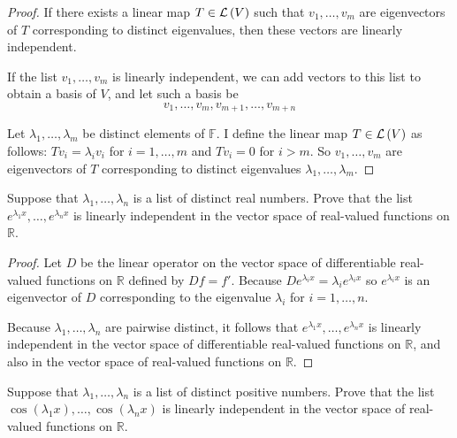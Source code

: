 \begin{proof}
    If there exists a linear map $T\in\mathcal{L}\left({V}\right)$ such that $v_{1} , \ldots, v_{m}$ are eigenvectors of $T$ corresponding to distinct eigenvalues, then these vectors are linearly independent.

    If the list $v_{1} , \ldots, v_{m}$ is linearly independent, we can add vectors to this list to obtain a basis of $V$, and let such a basis be
    \[
        v_{1} , \ldots, v_{m}, v_{m+1}, \ldots, v_{m+n}
    \]

    Let $\lambda_{1}, \ldots, \lambda_{m}$ be distinct elements of $\mathbb{F}$. I define the linear map $T\in\mathcal{L}\left({V}\right)$ as follows: $Tv_{i} = \lambda_{i}v_{i}$ for $i = 1, \ldots, m$ and $Tv_{i} = 0$ for $i > m$. So $v_{1} , \ldots, v_{m}$ are eigenvectors of $T$ corresponding to distinct eigenvalues $\lambda_{1}, \ldots, \lambda_{m}$.
\end{proof}
\newpage

\begin{exercise}
    Suppose that $\lambda_{1}, \ldots, \lambda_{n}$ is a list of distinct real numbers. Prove that the list $e^{\lambda_{1}x} , \ldots, e^{\lambda_{n}x}$ is linearly independent in the vector space of real-valued functions on $\mathbb{R}$.
\end{exercise}

\begin{proof}
    Let $D$ be the linear operator on the vector space of differentiable real-valued functions on $\mathbb{R}$ defined by $Df = f'$. Because $De^{\lambda_{i}x} = \lambda_{i}e^{\lambda_{i}x}$ so $e^{\lambda_{i}x}$ is an eigenvector of $D$ corresponding to the eigenvalue $\lambda_{i}$ for $i = 1, \ldots, n$.

    Because $\lambda_{1}, \ldots, \lambda_{n}$ are pairwise distinct, it follows that $e^{\lambda_{1}x} , \ldots, e^{\lambda_{n}x}$ is linearly independent in the vector space of differentiable real-valued functions on $\mathbb{R}$, and also in the vector space of real-valued functions on $\mathbb{R}$.
\end{proof}
\newpage

\begin{exercise}
    Suppose that $\lambda_{1}, \ldots, \lambda_{n}$ is a list of distinct positive numbers. Prove that the list $\cos{(\lambda_{1}x)} , \ldots, \cos{(\lambda_{n}x)}$ is linearly independent in the vector space of real-valued functions on $\mathbb{R}$.
\end{exercise}

